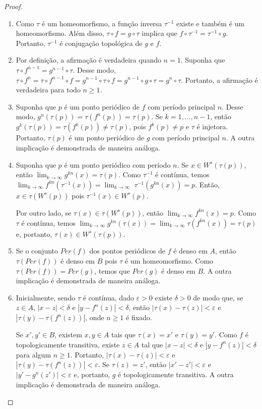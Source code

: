 \begin{proof}
\begin{enumerate}
\item Como $\tau$ é um homeomorfismo, a função inversa $\tau^{-1}$ existe e também é um homeomorfismo. Além disso, $\tau \circ f = g \circ \tau$ implica que $f \circ \tau^{-1} = \tau^{-1} \circ g$. Portanto, $\tau^{-1}$ é conjugação topológica de $g$ e $f$.
\item Por definição, a afirmação é verdadeira quando $n = 1$. Suponha que $\tau \circ f^{n-1} = g^{n-1} \circ \tau$. Desse modo, $\tau \circ f^n = \tau \circ f^{n-1} \circ f = g^{n-1} \circ \tau \circ f = g^{n-1} \circ g \circ  \tau = g^n \circ \tau$. Portanto, a afirmação é verdadeira para todo $n \geq 1$.
\item Suponha que $p$ é um ponto periódico de $f$ com período principal $n$. Desse modo, $g^n(\tau(p)) = \tau(f^n(p)) = \tau(p)$. Se $k = 1, \dots, n-1$, então $g^k(\tau(p)) = \tau(f^k(p)) \neq \tau(p)$, pois $f^k(p) \neq p$ e $\tau$ é injetora. Portanto, $\tau(p)$ é um ponto periódico de $g$ com período principal $n$. A outra implicação é demonstrada de maneira análoga.
\item Suponha que $p$ é um ponto periódico com período $n$. Se $x \in W^s(\tau(p))$, então $\lim_{k \to \infty} g^{kn}(x) = \tau(p)$. Como $\tau^{-1}$ é contínua, temos $\lim_{k \to \infty} f^{kn}(\tau^{-1}(x)) = \lim_{k \to \infty} $ $ \tau^{-1}(g^{kn}(x))= p$. Então,  $x \in \tau(W^s(p))$ pois $\tau^{-1}(x) \in W^s(p)$.

Por outro lado, se $\tau(x) \in \tau(W^s(p))$, então $\lim_{k \to \infty} f^{kn}(x) = p$. Como $\tau$ é contínua, temos $\lim_{k \to \infty} g^{kn}(\tau(x)) = \lim_{k \to \infty} \tau(f^{kn}(x)) = \tau(p)$ e, portanto, $\tau(x) \in W^s(\tau(p))$.
\item Se o conjunto $Per(f)$ dos pontos periódicos de $f$ é denso em $A$, então $\tau(Per(f))$ é denso em $B$ pois $\tau$ é um homeomorfismo. Como $\tau(Per(f)) = Per(g)$, temos que $Per(g)$ é denso em $B$. A outra implicação é demonstrada de maneira análoga.
\item Inicialmente, sendo $\tau$ é contínua, dado $\varepsilon > 0$ existe $\delta > 0$ de modo que, se $z \in A$, $|x - z| < \delta$ e $|y - f^n(z)| < \delta$, então $|\tau(x) - \tau(z)| < \varepsilon$ e $|\tau(y) - \tau(f^n(z))|$, onde $n \geq 1$ é fixado.

Se $x', y' \in B$, existem $x, y \in A$ tais que $\tau(x) = x'$ e $\tau(y) =  y'$. Como $f$ é topologicamente transitiva, existe $z \in A$ tal que $|x - z| < \delta$ e $|y - f^n(z)| < \delta$ para algum $n \geq 1$. Portanto, $|\tau(x) - \tau(z)| < \varepsilon$ e $|\tau(y) - \tau(f^n(z))| < \varepsilon$. Se $\tau(z) = z'$, então $|x' - z'| < \varepsilon$ e $|y' - g^n(z')| < \varepsilon$ e, portanto, $g$ é topologicamente transitiva. A outra implicação é demonstrada de maneira análoga.
\end{enumerate}
\end{proof}

